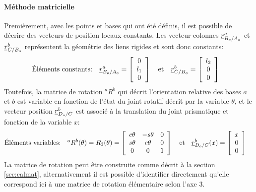 \paragraph{Méthode matricielle}

Premièrement, avec les points et bases qui ont été définis, il est possible de décrire des vecteurs de position locaux constants. Les vecteur-colonnes $\underline{r}_{B_o/A_o}^a$ et $\underline{r}_{C/B_o}^b$ représentent la géométrie des liens rigides et sont donc constants:
\begin{align}
\text{Éléments constants:}& \quad \underline{r}_{B_o/A_o}^a =  \left[ \begin{array}{c} 
0 \\ l_1 \\ 0
\end{array} \right]  \quad \text{et} \quad  \underline{r}_{C/B_o}^b =  \left[ \begin{array}{c} 
l_2 \\ 0 \\ 0
\end{array} \right] 
\end{align} 
Toutefois, la matrice de rotation ${}^aR^b$ qui décrit l'orientation relative des bases $a$ et $b$ est variable en fonction de l'état du joint rotatif décrit par la variable $\theta$, et le vecteur position $\underline{r}_{D_o/C}^b$ est associé à la translation du joint prismatique et fonction de la variable $x$:
\begin{align}
\text{Éléments variables:}& \quad {}^aR^b(\theta)= R_3(\theta) = \left[ \begin{array}{c c c}
	c\theta & -s\theta & 0 \\
	s\theta & c\theta & 0 \\
	0 & 0 & 1 
\end{array}  \right]  \quad \text{et} \quad  \underline{r}_{D_o/C}^b(x) =  \left[ \begin{array}{c} 
x \\ 0 \\ 0
\end{array} \right] 
\end{align} 
La matrice de rotation peut être construite comme décrit à la section \ref{sec:calmat}, alternativement il est possible d’identifier directement qu'elle correspond ici à une matrice de rotation élémentaire selon l'axe 3.

